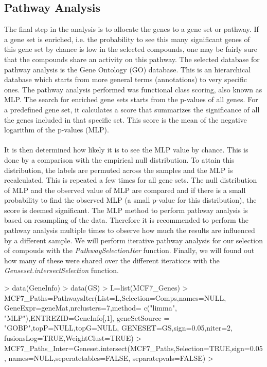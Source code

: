 \documentclass[a4paper]{article}
\begin{document}
\subsection{Pathway Analysis}
The final step in the analysis is to allocate the genes to a gene set or
pathway. If a gene set is enriched, i.e. the probability to see this many
significant genes of this gene set by chance is low in the selected compounds,
one may be fairly sure that the compounds share an activity on this pathway.
The selected database for pathway analysis is the Gene Ontology (GO) database.
This is an hierarchical database which starts from more general terms
(annotations) to very specific ones. The pathway analysis performed was
functional class scoring, also known as MLP. The search for enriched gene sets
starts from the p-values of all genes. For a predefined gene set, it calculates
a score that summarizes the significance of all the genes included in that
specific set. This score is the mean of the negative logarithm of the p-values
(MLP).\\ \\
It is then determined how likely it is to see the MLP value by chance. This is
done by a comparison with the empirical null distribution. To attain this
distribution, the labels are permuted across the samples and the MLP is
recalculated. This is repeated a few times for all gene sets. The null
distribution of MLP and the observed value of MLP are compared and if there is a
small probability to find the observed MLP (a small p-value for this
distribution), the score is deemed significant. The MLP method to perform
pathway analysis is based on resampling of the data. Therefore it is recommended
to perform the pathway analysis multiple times to observe how much the results
are influenced by a different sample. We will perform iterative pathway analysis
for our selection of compouds with the {\it PathwaySelectionIter} function.
Finally, we will found out how many of these were shared over the different
iterations with the {\it Genseset.intersectSelection} function.
\begin{Schunk}
\begin{Sinput}
> data(GeneInfo)
> data(GS)
> L=list(MCF7_Genes)
> MCF7_Paths=PathwaysIter(List=L,Selection=Comps,names=NULL,
                         GeneExpr=geneMat,nrclusters=7,method=
                         c("limma", "MLP"),ENTREZID=GeneInfo[,1],
                         geneSetSource = "GOBP",topP=NULL,topG=NULL,
                         GENESET=GS,sign=0.05,niter=2,
                         fusionsLog=TRUE,WeightClust=TRUE)
> MCF7_Paths_Inter=Geneset.intersect(MCF7_Paths,Selection=TRUE,sign=0.05,
                                    names=NULL,seperatetables=FALSE,
                                    separatepvals=FALSE)
> 
\end{Sinput}
\end{Schunk}
\newpage
\end{document}
